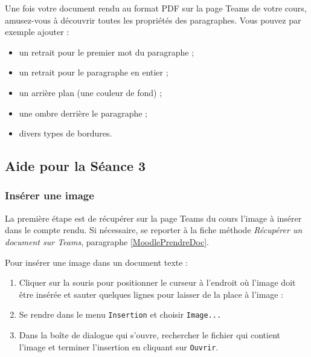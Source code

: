 {Une fois votre document rendu au format PDF sur la page Teams de votre cours, amusez-vous à découvrir toutes les propriétés des paragraphes. Vous pouvez par exemple ajouter :
\begin{itemize}
\item un retrait pour le premier mot du paragraphe ;
\item un retrait pour le paragraphe en entier ; 
\item un arrière plan (une couleur de fond) ;
\item une ombre derrière le paragraphe ; 
\item divers types de bordures. 
\end{itemize}


%
%
%
%


\subsection{Aide pour la Séance 3}\label{correction_texte03}



\subsubsection{Insérer une image}

La première étape est de récupérer sur la page Teams du cours l'image à insérer dans le compte rendu. Si nécessaire, se reporter à la fiche méthode \emph{Récupérer un document sur Teams}, paragraphe \vref{MoodlePrendreDoc}.

\vspace{12pt}

Pour insérer une image dans un document texte :

\begin{enumerate}
\item Cliquer sur la souris pour positionner le curseur à l'endroit où l'image doit être insérée et sauter quelques lignes pour laisser de la place à l'image :


\item Se rendre dans le menu \texttt{Insertion} et choisir \texttt{Image...}


\item Dans la boîte de dialogue qui s'ouvre, rechercher le fichier qui contient l'image et terminer l'insertion en cliquant sur \texttt{Ouvrir}.


\end{enumerate}}
